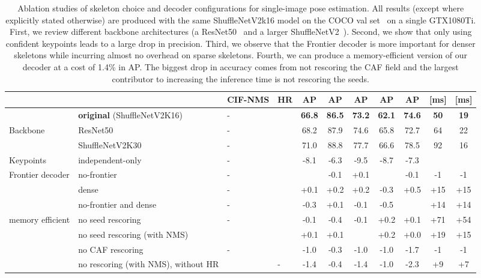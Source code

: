 \documentclass[journal]{IEEEtran}
\begin{document}
\begin{table*}
  \centering
  \caption{
    Ablation studies of skeleton choice and decoder configurations for single-image pose estimation.
    All results (except where explicitly stated otherwise) are produced with the same ShuffleNetV2k16
    model on the COCO val set~\cite{lin2014microsoft} on a single GTX1080Ti.
    First, we review different backbone architectures (a ResNet50~\cite{he2016deep}
    and a larger ShuffleNetV2~\cite{ma2018shufflenet}).
    Second, we show that only using confident keypoints leads to a large
    drop in precision.
    Third, we observe that the Frontier decoder is more important for denser skeletons while incurring almost no overhead on sparse skeletons.
    Fourth, we can produce a memory-efficient version of our decoder at a cost of 1.4\% in AP. The biggest drop in accuracy comes from not rescoring the CAF field and the largest contributor to increasing the inference time is not rescoring the seeds.
  }
  \label{tab:single-image-ablation}
  \begin{tabular}{|l l|H H c c c c c c c|}
    \hline
    & & CIF-NMS & HR & AP & AP & AP & AP & AP &  [ms] &  [ms] \\
    \hline\hline

    & \textbf{original} (ShuffleNetV2K16)
    & - &  & \textbf{66.8} & \textbf{86.5} & \textbf{73.2} & \textbf{62.1} & \textbf{74.6} & \textbf{50} & \textbf{19} \\


    \hline

    Backbone & ResNet50
    & - &       & 68.2 & 87.9 & 74.6 & 65.8     & 72.7     & 64   & 22 \\
    & ShuffleNetV2K30
    & - &       & 71.0 & 88.8 & 77.7 & 66.6     & 78.5     & 92   & 16 \\

    \hline

    Keypoints & independent-only
    & - &  & -8.1 & -6.3 & -9.5 & -8.7 & -7.3 &  &  \\

    \hline

    Frontier decoder & no-frontier
    & - &  &  & -0.1 & +0.1 &  & -0.1 & -1 & -1 \\
    & dense
    & - &  & +0.1 & +0.2 & +0.2 & -0.3 & +0.5 & +15 & +15 \\
    & no-frontier and dense
    & - &  & -0.3 & +0.1 & -0.1 & -0.5 &  & +14 & +14 \\

    \hline

    memory efficient & no seed rescoring
    & - &  & -0.1 & -0.4 & -0.1 & +0.2 & +0.1 & +71 & +54 \\
    & no seed rescoring (with NMS)
    &  &  & +0.1 & +0.1 &  & +0.2 & +0.0 & +19 & +15 \\
    & no CAF rescoring
    & - &  & -1.0 & -0.3 & -1.0 & -1.0 & -1.7 & -1 & -1 \\
    & no rescoring (with NMS), without HR
    &  & - & -1.4 & -0.4 & -1.4 & -1.0 & -2.3 & +9 & +7 \\

    \hline
  \end{tabular}
\end{table*}
\end{document}

